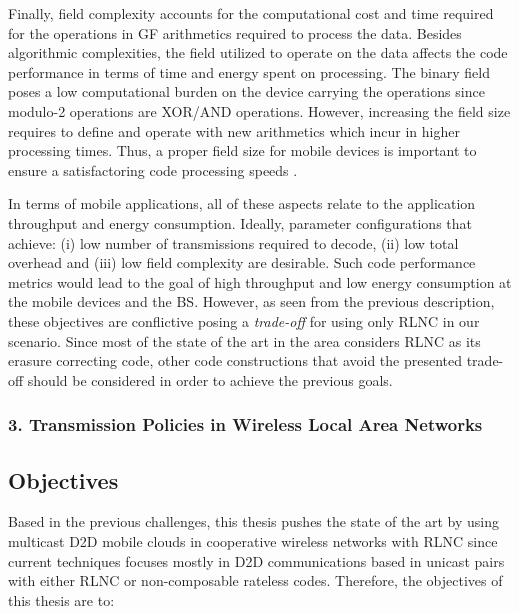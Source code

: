 Finally, field complexity accounts for the computational cost and time required for the operations in \ac{GF} arithmetics required to process the data. Besides algorithmic complexities, the field utilized to operate on the data affects the code performance in terms of time and energy spent on processing. The binary field poses a low computational burden on the device carrying the operations since modulo-2 operations are XOR/AND operations. However, increasing the field size requires to define and operate with new arithmetics which incur in higher processing times. Thus, a proper field size for mobile devices is important to ensure a satisfactoring code processing speeds \cite{heide2009network,paramanathan2013lean}.

In terms of mobile applications, all of these aspects relate to the application throughput and energy consumption. Ideally, parameter configurations that achieve: (i) low number of transmissions required to decode, (ii) low total overhead and (iii) low field complexity are desirable. Such code performance metrics would lead to the goal of high throughput and low energy consumption at the mobile devices and the \ac{BS}. However, as seen from the previous description, these objectives are conflictive posing a \textit{trade-off} for using only \ac{RLNC} in our scenario. Since most of the state of the art in the area considers \ac{RLNC} as its erasure correcting code, other code constructions that avoid the presented trade-off should be considered in order to achieve the previous goals.

\subsubsection{3. Transmission Policies in Wireless Local Area Networks}


\subsection{Objectives}
Based in the previous challenges, this thesis pushes the state of the art by using multicast \ac{D2D} mobile clouds in cooperative wireless networks with \ac{RLNC} since current techniques focuses mostly in \ac{D2D} communications based in unicast pairs with either \ac{RLNC} or non-composable rateless codes. Therefore, the objectives of this thesis are to:

